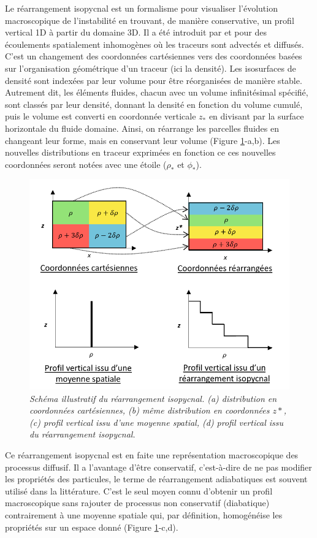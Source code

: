 \documentclass[a4paper,12pt]{article}
\begin{document}
        Le réarrangement isopycnal est un formalisme pour visualiser l'évolution macroscopique de l'instabilité en trouvant, de manière conservative, un profil vertical 1D à partir du domaine 3D. Il a été introduit par \citep{nakamura_two-dimensional_1996} et \citep*{winters_diascalar_1996} pour des écoulements spatialement inhomogènes où les traceurs sont advectés et diffusés. C'est un changement des coordonnées cartésiennes vers des coordonnées basées sur l'organisation géométrique d'un traceur (ici la densité). Les isosurfaces de densité sont indexées par leur volume pour être réorganisées de manière stable. Autrement dit, les éléments fluides, chacun avec un volume infinitésimal spécifié, sont classés par leur densité, donnant la densité en fonction du volume cumulé, puis le volume est converti en coordonnée verticale $z_*$ en divisant par la surface horizontale du fluide domaine. Ainsi, on réarrange les parcelles fluides en changeant leur forme, mais en conservant leur volume (Figure \ref{rea_isop}-a,b). Les nouvelles distributions en traceur exprimées en fonction ce ces nouvelles coordonnées seront notées avec une étoile ($\rho_*$ et $\phi_*$).
        \begin{figure}[!h]
	    \centering		
		    \includegraphics[width=0.85\linewidth]{figures/rearrangementisop.png}
            \caption{\textit{Schéma illustratif du réarrangement isopycnal. (a) distribution en coordonnées cartésiennes, (b) même distribution en coordonnées $z*$, (c) profil vertical issu d'une moyenne spatial, (d) profil vertical issu du réarrangement isopycnal.}}
	        \label{rea_isop}
        \end{figure}
        Ce réarrangement isopycnal est en faite une représentation macroscopique des processus diffusif. Il a l'avantage d'être conservatif, c'est-à-dire de ne pas modifier les propriétés des particules, le terme de réarrangement adiabatiques est souvent utilisé dans la littérature. C'est le seul moyen connu d'obtenir un profil macroscopique sans rajouter de processus non conservatif (diabatique) contrairement à une moyenne spatiale qui, par définition, homogénéise les propriétés sur un espace donné (Figure \ref{rea_isop}-c,d). \\
\end{document}
